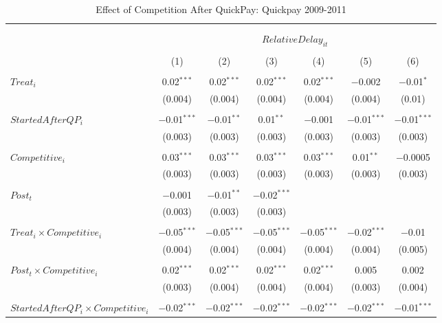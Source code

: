 \documentclass[
]{article}
\begin{document}
\begin{table}[H] \centering 
  \caption{Effect of Competition After QuickPay: Quickpay 2009-2011} 
  \label{} 
\small 
\begin{tabular}{@{\extracolsep{-3pt}}lcccccc} 
\\[-1.8ex]\hline 
\hline \\[-1.8ex] 
\\[-1.8ex] & \multicolumn{6}{c}{$RelativeDelay_{it}$  } \\ 
\\[-1.8ex] & (1) & (2) & (3) & (4) & (5) & (6)\\ 
\hline \\[-1.8ex] 
 $Treat_i$ & 0.02$^{***}$ & 0.02$^{***}$ & 0.02$^{***}$ & 0.02$^{***}$ & $-$0.002 & $-$0.01$^{*}$ \\ 
  & (0.004) & (0.004) & (0.004) & (0.004) & (0.004) & (0.01) \\ 
  & & & & & & \\ 
 $StartedAfterQP_i$ & $-$0.01$^{***}$ & $-$0.01$^{**}$ & 0.01$^{**}$ & $-$0.001 & $-$0.01$^{***}$ & $-$0.01$^{***}$ \\ 
  & (0.003) & (0.003) & (0.003) & (0.003) & (0.003) & (0.003) \\ 
  & & & & & & \\ 
 $Competitive_i$ & 0.03$^{***}$ & 0.03$^{***}$ & 0.03$^{***}$ & 0.03$^{***}$ & 0.01$^{**}$ & $-$0.0005 \\ 
  & (0.003) & (0.003) & (0.003) & (0.003) & (0.003) & (0.003) \\ 
  & & & & & & \\ 
 $Post_t$ & $-$0.001 & $-$0.01$^{**}$ & $-$0.02$^{***}$ &  &  &  \\ 
  & (0.003) & (0.003) & (0.003) &  &  &  \\ 
  & & & & & & \\ 
 $Treat_i \times Competitive_i$ & $-$0.05$^{***}$ & $-$0.05$^{***}$ & $-$0.05$^{***}$ & $-$0.05$^{***}$ & $-$0.02$^{***}$ & $-$0.01 \\ 
  & (0.004) & (0.004) & (0.004) & (0.004) & (0.004) & (0.005) \\ 
  & & & & & & \\ 
 $Post_t \times Competitive_i$ & 0.02$^{***}$ & 0.02$^{***}$ & 0.02$^{***}$ & 0.02$^{***}$ & 0.005 & 0.002 \\ 
  & (0.003) & (0.004) & (0.004) & (0.004) & (0.003) & (0.004) \\ 
  & & & & & & \\ 
 $StartedAfterQP_i \times Competitive_i$ & $-$0.02$^{***}$ & $-$0.02$^{***}$ & $-$0.02$^{***}$ & $-$0.02$^{***}$ & $-$0.02$^{***}$ & $-$0.01$^{***}$ \\ 

\end{tabular}
\end{table}
\end{document}
